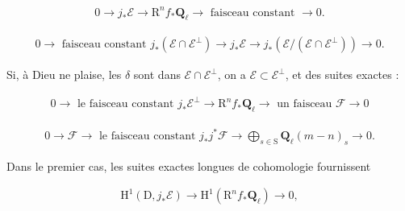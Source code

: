 \documentclass[10pt,leqno]{article}
\begin{document}
\begin{equation*}\begin{gathered}0 \longrightarrow  j_{*}\mathcal{E}  \longrightarrow  \mathrm{R}^{n} f_{*}\mathbf{Q}_{\ell } \longrightarrow \text{ faisceau constant }\longrightarrow  0.\end{gathered}\tag{7.1.2}\end{equation*}

\begin{equation*}\begin{gathered}0 \longrightarrow \text{ faisceau constant }j_{*}(\mathcal{E} \cap \mathcal{E} ^{\perp }) \longrightarrow  j_{*}\mathcal{E}  \longrightarrow  j_{*}(\mathcal{E} /(\mathcal{E} \cap \mathcal{E} ^{\perp })) \longrightarrow  0.\end{gathered}\tag{7.1.3}\end{equation*}

\noindent Si, à Dieu ne plaise, les \(\delta \) sont dans \(\mathcal{E} \cap \mathcal{E} ^{\perp }\), on a \(\mathcal{E} \subset \mathcal{E} ^{\perp }\), et des suites exactes :\par

\begin{equation*}\begin{gathered}0 \longrightarrow \text{ le faisceau constant }j_{*}\mathcal{E} ^{\perp } \longrightarrow  \mathrm{R}^{n} f_{*}\mathbf{Q}_{\ell } \longrightarrow \text{ un faisceau }\mathcal{F}  \longrightarrow  0\end{gathered}\tag{7.1.4}\end{equation*}

\begin{equation*}\begin{gathered}0 \longrightarrow  \mathcal{F}  \longrightarrow \text{ le faisceau constant }j_{*}j^{*}\mathcal{F}  \longrightarrow  \bigoplus\limits_{s\in \mathrm{S}}\mathbf{Q}_{\ell }(m- n)_{s} \longrightarrow  0.\end{gathered}\tag{7.1.5}\end{equation*}

\noindent Dans le premier cas, les suites exactes longues de cohomologie fournissent\par

\begin{equation*}\begin{gathered}\mathrm{H}^{1}(\mathrm{D},j_{*}\mathcal{E} ) \longrightarrow  \mathrm{H}^{1}(\mathrm{R}^{n} f_{*}\mathbf{Q}_{\ell }) \longrightarrow  0,\end{gathered}\tag{7.1.2′}\end{equation*}
\end{document}
